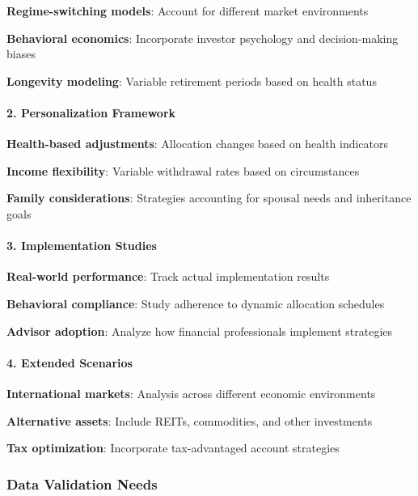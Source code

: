 \documentclass[11pt,letterpaper]{article}
\begin{document}
{{{{{{{{{{{\item \textbf{Regime-switching models}: Account for different market environments
\item \textbf{Behavioral economics}: Incorporate investor psychology and decision-making biases
\item \textbf{Longevity modeling}: Variable retirement periods based on health status

\paragraph{2. Personalization Framework}

\item \textbf{Health-based adjustments}: Allocation changes based on health indicators
\item \textbf{Income flexibility}: Variable withdrawal rates based on circumstances
\item \textbf{Family considerations}: Strategies accounting for spousal needs and inheritance goals

\paragraph{3. Implementation Studies}

\item \textbf{Real-world performance}: Track actual implementation results
\item \textbf{Behavioral compliance}: Study adherence to dynamic allocation schedules
\item \textbf{Advisor adoption}: Analyze how financial professionals implement strategies

\paragraph{4. Extended Scenarios}

\item \textbf{International markets}: Analysis across different economic environments
\item \textbf{Alternative assets}: Include REITs, commodities, and other investments
\item \textbf{Tax optimization}: Incorporate tax-advantaged account strategies

\subsubsection{Data Validation Needs}


}}}}}}}}}}}
\end{document}
